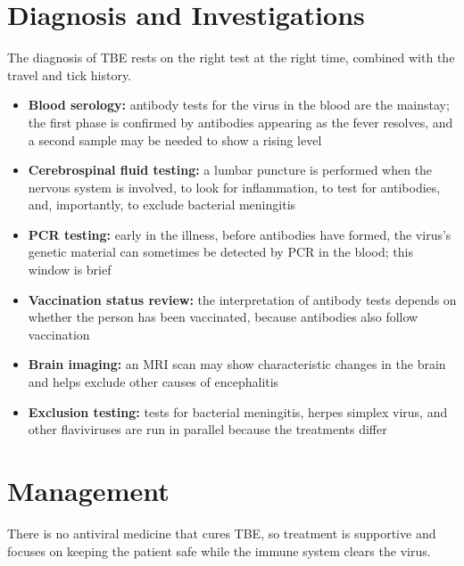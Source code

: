 \section*{Diagnosis and Investigations}
The diagnosis of TBE rests on the right test at the right time, combined with the travel and tick history.

\begin{itemize}
    \item \textbf{Blood serology:} antibody tests for the virus in the blood are the mainstay; the first phase is confirmed by antibodies appearing as the fever resolves, and a second sample may be needed to show a rising level
    \item \textbf{Cerebrospinal fluid testing:} a lumbar puncture is performed when the nervous system is involved, to look for inflammation, to test for antibodies, and, importantly, to exclude bacterial meningitis
    \item \textbf{PCR testing:} early in the illness, before antibodies have formed, the virus's genetic material can sometimes be detected by PCR in the blood; this window is brief
    \item \textbf{Vaccination status review:} the interpretation of antibody tests depends on whether the person has been vaccinated, because antibodies also follow vaccination
    \item \textbf{Brain imaging:} an MRI scan may show characteristic changes in the brain and helps exclude other causes of encephalitis
    \item \textbf{Exclusion testing:} tests for bacterial meningitis, herpes simplex virus, and other flaviviruses are run in parallel because the treatments differ
\end{itemize}

\section*{Management}
There is no antiviral medicine that cures TBE, so treatment is supportive and focuses on keeping the patient safe while the immune system clears the virus.

